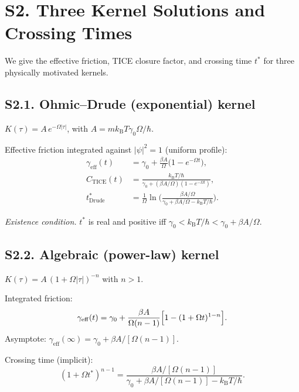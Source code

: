 \documentclass[twocolumn,showpacs,preprintnumbers,amsmath,amssymb]{revtex4-2}
\newcommand{\kB}{k_{\mathrm{B}}}
\newcommand{\geff}{\gamma_{\mathrm{eff}}}
\newcommand{\CTICE}{C_{\mathrm{TICE}}}
\begin{document}
\section{S2. Three Kernel Solutions and Crossing Times}
\label{sec:kernels}

We give the effective friction, TICE closure factor, and
crossing time $t^*$ for three physically motivated kernels.

\subsection{S2.1. Ohmic--Drude (exponential) kernel}

$K(\tau) = A\,e^{-\Omega|\tau|}$, with
$A = m\kB T\gamma_0\Omega/\hbar$.

Effective friction integrated against $|\psi|^2 = 1$
(uniform profile):
\begin{align}
  \geff(t) &= \gamma_0 + \frac{\beta A}{\Omega}
  \bigl(1 - e^{-\Omega t}\bigr) , \\
  \CTICE(t) &= \frac{\kB T/\hbar}
  {\gamma_0 + (\beta A/\Omega)(1 - e^{-\Omega t})} , \\
  t^*_{\mathrm{Drude}} &= \frac{1}{\Omega}\ln\!\Biggl(
  \frac{\beta A/\Omega}
  {\gamma_0 + \beta A/\Omega - \kB T/\hbar}\Biggr) .
  \label{eq:tstar_Drude}
\end{align}

\textit{Existence condition.}
$t^*$ is real and positive iff
$\gamma_0 < \kB T/\hbar < \gamma_0 + \beta A/\Omega$.

\subsection{S2.2. Algebraic (power-law) kernel}

$K(\tau) = A\,(1 + \Omega|\tau|)^{-n}$ with $n > 1$.

Integrated friction:
\begin{equation}
  \geff(t) = \gamma_0 + \frac{\beta A}{\Omega(n-1)}
  \Bigl[1 - (1+\Omega t)^{1-n}\Bigr] .
\end{equation}
Asymptote: $\geff(\infty) = \gamma_0 + \beta A/[\Omega(n-1)]$.

Crossing time (implicit):
\begin{equation}
  (1 + \Omega t^*)^{n-1}
  = \frac{\beta A/[\Omega(n-1)]}
  {\gamma_0 + \beta A/[\Omega(n-1)] - \kB T/\hbar} .
  \label{eq:tstar_alg}
\end{equation}
\end{document}
